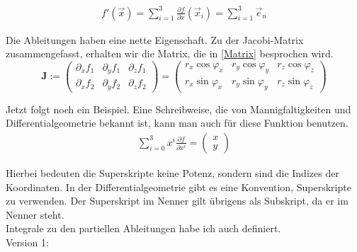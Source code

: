 \documentclass[a4paper]{article}
\begin{document}
\begin{displaymath}
\begin{align}
f'(\vec{x}) = \sum_{i=1}^{3}\frac{\partial f}{\partial x}(\vec{x}_i) = \sum_{i=1}^{3}\vec{e}_{n}
\end{align}
\end{displaymath}

Die Ableitungen haben eine nette Eigenschaft. Zu der Jacobi-Matrix zusammengefasst, erhalten wir die Matrix, die in \ref{Matrix} besprochen wird.\\

\begin{displaymath}
\boldsymbol{J} := \begin{pmatrix}
	\partial_x f_{1} & \partial_y f_{1} & \partial_z f_{1}\\
	\partial_x f_{2} & \partial_y f_{2} & \partial_z f_{2}
\end{pmatrix} = \begin{pmatrix}r_x \cos \varphi_x & r_y \cos \varphi_y & r_z \cos \varphi_z\\
r_x \sin \varphi_x & r_y \sin \varphi_y & r_z \sin \varphi_z \end{pmatrix}
\end{displaymath}

Jetzt folgt noch ein Beispiel. Eine Schreibweise, die von Mannigfaltigkeiten und Differentialgeometrie bekannt ist, kann man auch f\"ur diese Funktion benutzen.\\

\begin{displaymath}
\begin{align}
     \sum_{i=0}^{3}x^{i}\frac{\partial f}{\partial x^{i}} = \begin{pmatrix}x\\y\end{pmatrix}
\end{align}
\end{displaymath}

Hierbei bedeuten die Superskripte keine Potenz, sondern sind die Indizes der Koordinaten. In der Differentialgeometrie gibt es eine Konvention, Superskripte zu verwenden. Der Superskript im Nenner gilt \"ubrigens als Subskript, da er im Nenner steht.\\


Integrale zu den partiellen Ableitungen habe ich auch definiert.\\

Version 1:\\
\end{document}

